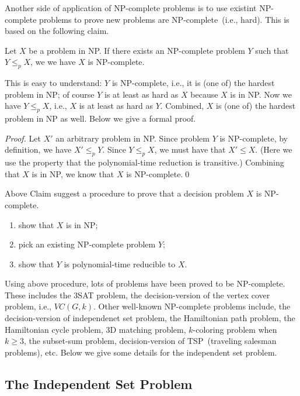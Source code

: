Another side of application of NP-complete problems is to use existint NP-complete problems
to prove new problems are NP-complete~(i.e., hard). This is based on the following claim.

\begin{claim}
Let $X$ be a problem in NP. If there exists an NP-complete problem $Y$ such that $Y\le_p X$,
we we have $X$ is NP-complete.
\end{claim}

This is easy to understand: $Y$ is NP-complete, i.e., it is (one of) the hardest problem
in NP; of course $Y$ is at least as hard as $X$ because $X$ is in NP.
Now we have $Y\le_p X$, i.e., $X$ is at least as hard as $Y$. Combined, $X$ is (one of) the
hardest problem in NP as well. Below we give a formal proof.

\emph{Proof.} Let $X'$ an arbitrary problem in NP. Since problem $Y$ is NP-complete,
by definition, we have $X' \le_p Y$. Since $Y\le_p X$, we must have that $X'\le X$.
(Here we use the property that the polynomial-time reduction is transitive.)
Combining that $X$ is in NP, we know that $X$ is NP-complete.\qed

Above Claim suggest a procedure to prove that a decision problem $X$ is NP-complete.
\begin{enumerate}
\item show that $X$ is in NP;
\item pick an existing NP-complete problem $Y$;
\item show that $Y$ is polynomial-time reducible to $X$. 
\end{enumerate}

Using above procedure, lots of problems have been proved to be NP-complete.
These includes the 3SAT problem, the decision-version of the vertex cover problem, i.e., $VC(G,k)$.
Other well-known NP-complete problems include, the decision-version of independenet set problem,
the Hamiltonian path problem, 
the Hamiltonian cycle problem, 
3D matching problem, $k$-coloring problem when $k\ge 3$, the subset-sum problem, decision-version of TSP~(traveling salesman problems), etc.
Below we give some details for the independent set problem.

\subsection*{The Independent Set Problem}

